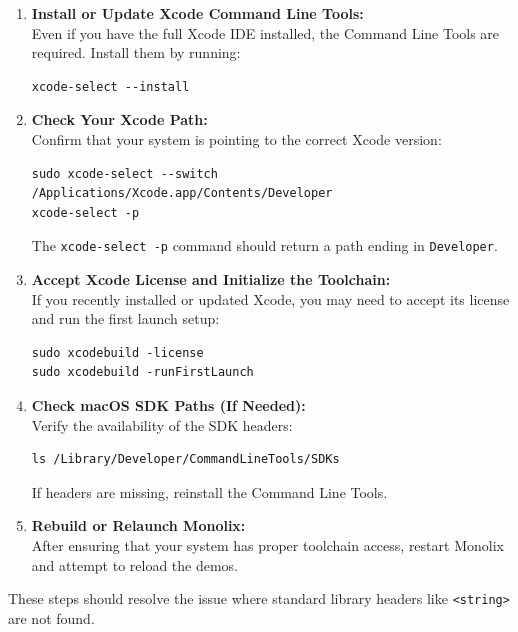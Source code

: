 \documentclass{article}
\begin{document}
\begin{enumerate}
    \item \textbf{Install or Update Xcode Command Line Tools:}\\
    Even if you have the full Xcode IDE installed, the Command Line Tools are required. Install them by running:
    \begin{verbatim}
xcode-select --install
    \end{verbatim}

    \item \textbf{Check Your Xcode Path:}\\
    Confirm that your system is pointing to the correct Xcode version:
    \begin{verbatim}
sudo xcode-select --switch /Applications/Xcode.app/Contents/Developer
xcode-select -p
    \end{verbatim}
    The \texttt{xcode-select -p} command should return a path ending in \texttt{Developer}.

    \item \textbf{Accept Xcode License and Initialize the Toolchain:}\\
    If you recently installed or updated Xcode, you may need to accept its license and run the first launch setup:
    \begin{verbatim}
sudo xcodebuild -license
sudo xcodebuild -runFirstLaunch
    \end{verbatim}

    \item \textbf{Check macOS SDK Paths (If Needed):}\\
    Verify the availability of the SDK headers:
    \begin{verbatim}
ls /Library/Developer/CommandLineTools/SDKs
    \end{verbatim}
    If headers are missing, reinstall the Command Line Tools.

    \item \textbf{Rebuild or Relaunch Monolix:}\\
    After ensuring that your system has proper toolchain access, restart Monolix and attempt to reload the demos.
\end{enumerate}

These steps should resolve the issue where standard library headers like \texttt{<string>} are not found.
\end{document}
